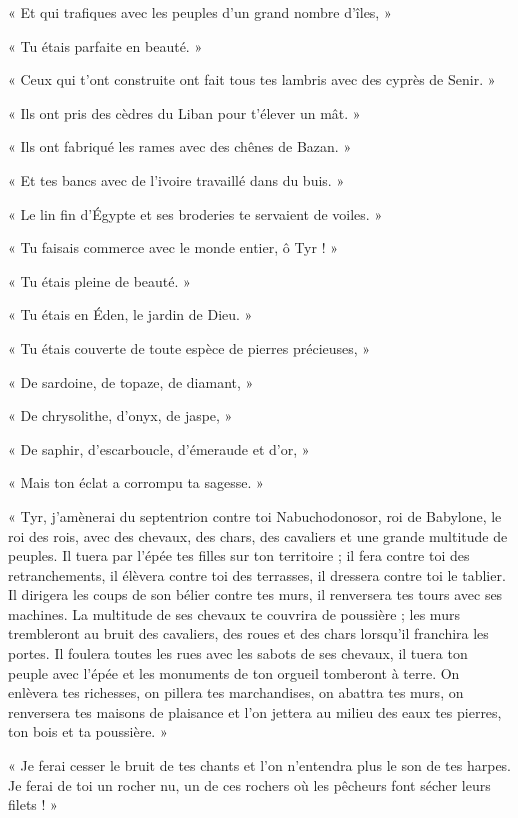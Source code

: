 \documentclass[a4paper, 11pt, oneside, polutonikogreek, french]{article}
\begin{document}
« Et qui trafiques avec les peuples d'un grand nombre d'îles, »

« Tu étais parfaite en beauté. »

« Ceux qui t'ont construite ont fait tous tes lambris avec des cyprès de Senir. »

« Ils ont pris des cèdres du Liban pour t'élever un mât. »

« Ils ont fabriqué les rames avec des chênes de Bazan. »

« Et tes bancs avec de l'ivoire travaillé dans du buis. »

« Le lin fin d'Égypte et ses broderies te servaient de voiles. »

« Tu faisais commerce avec le monde entier, ô Tyr ! »

« Tu étais pleine de beauté. »

« Tu étais en Éden, le jardin de Dieu. »

« Tu étais couverte de toute espèce de pierres précieuses, »

« De sardoine, de topaze, de diamant, »

« De chrysolithe, d'onyx, de jaspe, »

« De saphir, d'escarboucle, d'émeraude et d'or, »

« Mais ton éclat a corrompu ta sagesse. »

« Tyr, j'amènerai du septentrion contre toi Nabuchodonosor, roi de Babylone, le roi des rois, avec des chevaux, des chars, des cavaliers et une grande multitude de peuples. Il tuera par l'épée tes filles sur ton territoire ; il fera contre toi des retranchements, il élèvera contre toi des terrasses, il dressera contre toi le tablier. Il dirigera les coups de son bélier contre tes murs, il renversera tes tours avec ses machines. La multitude de ses chevaux te couvrira de poussière ; les murs trembleront au bruit des cavaliers, des roues et des chars lorsqu'il franchira les portes. Il foulera toutes les rues avec les sabots de ses chevaux, il tuera ton peuple avec l'épée et les monuments de ton orgueil tomberont à terre. On enlèvera tes richesses, on pillera tes marchandises, on abattra tes murs, on renversera tes maisons de plaisance et l'on jettera au milieu des eaux tes pierres, ton bois et ta poussière. »

« Je ferai cesser le bruit de tes chants et l'on n'entendra plus le son de tes harpes. Je ferai de toi un rocher nu, un de ces rochers où les pêcheurs font sécher leurs filets ! »

\bigskip
\centerline{\EightStarTaper}
\centerline{\EightStarTaper\EightStarTaper}
\bigskip
\end{document}
